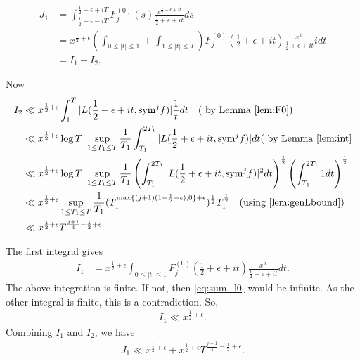 \documentclass[10pt]{amsart}
\begin{document}
\begin{align*}
    J_1 &= \int_{\frac{1}{2}+\epsilon - iT}^{\frac{1}{2}+\epsilon+iT}F_j^{(0)}(s) \frac{x^{\frac{1}{2}+\epsilon+it}}{\frac{1}{2}+\epsilon+it}ds \\
    &= x^{\frac{1}{2}+\epsilon}\left( \int_{0\leq |t|\leq 1} + \int_{1 \leq |t| \leq T} \right)F_j^{(0)}\left(\frac{1}{2}+\epsilon+it\right) \frac{x^{it}}{\frac{1}{2}+\epsilon+it}idt\\
    &= I_1+I_2.
\end{align*}

Now \begin{align*}
    I_2 &\ll x^{\frac{1}{2}+\epsilon} \int_{1}^{T}|L(\frac{1}{2}+\epsilon+it, \mathrm{sym}^j f)| \frac{1}{t} dt \quad ( \text{ by Lemma } \ref{lem:F0})\\
    &\ll x^{\frac{1}{2}+\epsilon} \log T\text{ }\sup_{1 \leq T_1 \leq T}\frac{1}{T_1}\int_{T_1}^{2T_1}|L(\frac{1}{2}+\epsilon+it, \mathrm{sym}^j f)| dt ( \text{ by Lemma } \ref{lem:int}  \\
    & \ll x^{\frac{1}{2}+\epsilon}\log T\text{ }\sup_{1 \leq T_1 \leq T}\frac{1}{T_1} \left( \int_{T_1}^{2T_1}|L(\frac{1}{2}+\epsilon+it, \mathrm{sym}^j f)|^2 dt \right)^{\frac{1}{2}}\left( \int_{T_1}^{2T_1} 1 dt \right)^{\frac{1}{2}} \\
    & \ll x^{\frac{1}{2}+\epsilon} \sup_{1 \leq T_1 \leq T}\frac{1}{T_1}(T_1^{\max\{(j+1)(1-\frac{1}{2}-\epsilon), 0\} + \epsilon})^{\frac{1}{2}}T_1^\frac{1}{2} \quad \text{(using \ref{lem:genLbound})} \\
    & \ll x^{\frac{1}{2}+\epsilon}T^{\frac{j+1}{4}-\frac{1}{2}+\epsilon}.
\end{align*}

The first integral gives \begin{align*}
    I_1 &= x^{\frac{1}{2}+\epsilon}\int_{0 \leq |t| \leq 1}F_j^{(0)}\left(\frac{1}{2}+\epsilon+it\right) \frac{x^{it}}{\frac{1}{2}+\epsilon+it}dt.
    \end{align*}
    The above integration is finite. If not, then \eqref{eq:sum_l0} would be infinite. As the other integral is finite, this is a contradiction. So,
    \begin{align*}
        I_1 \ll x^{\frac{1}{2}+\epsilon}.
    \end{align*}
Combining $I_1$ and $I_2$, we have \begin{align}
    J_1 \ll x^{\frac{1}{2}+\epsilon} + x^{\frac{1}{2}+\epsilon} T^{\frac{j+1}{4}-\frac{1}{2}+\epsilon}.
\end{align}
\end{document}
